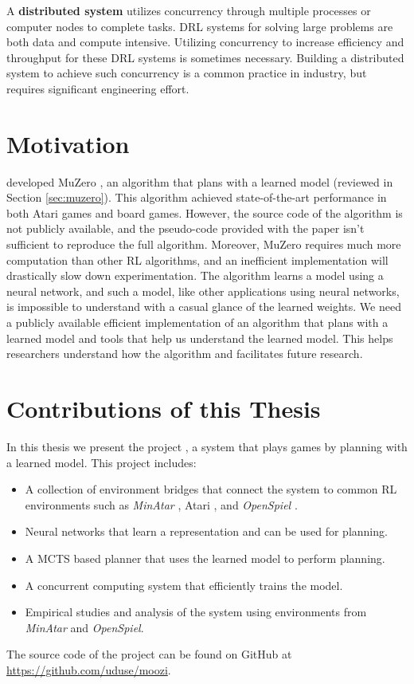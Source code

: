 A \textbf{distributed system} utilizes concurrency through multiple processes or computer nodes to complete tasks.
DRL systems for solving large problems are both data and compute intensive.
Utilizing concurrency to increase efficiency and throughput for these DRL systems is sometimes necessary.
Building a distributed system to achieve such concurrency is a common practice in industry, but requires significant engineering effort.

\section{Motivation}
\citeauthor{MasteringAtariGo_Schrittwieser.Antonoglou.ea_2020} developed MuZero \cite{MasteringAtariGo_Schrittwieser.Antonoglou.ea_2020}, an algorithm that plans with a learned model (reviewed in Section \ref{sec:muzero}).
This algorithm achieved state-of-the-art performance in both Atari games and board games.
However, the source code of the algorithm is not publicly available, and the pseudo-code provided with the paper isn't sufficient to reproduce the full algorithm.
Moreover, MuZero requires much more computation than other RL algorithms, and an inefficient implementation will drastically slow down experimentation.
The algorithm learns a model using a neural network, and such a model, like other applications using neural networks, is impossible to understand with a casual glance of the learned weights.
We need a publicly available efficient implementation of an algorithm that plans with a learned model and tools that help us understand the learned model.
This helps researchers understand how the algorithm and facilitates future research.

\section{Contributions of this Thesis}
In this thesis we present the project \textbf{\moozi}, a system that plays games by planning with a learned model.
This project includes:
\begin{itemize}
    \item A collection of environment bridges that connect the system to common RL environments such as \textit{MinAtar} \cite{MasteringAtariGames_Ye.Liu.ea_2021}, Atari \cite{ArcadeLearningEnvironment_Bellemare.Naddaf.ea_2013}, and \textit{OpenSpiel} \cite{OpenSpielFrameworkReinforcement_Lanctot.Lockhart.ea_2020}.
    \item Neural networks that learn a representation and can be used for planning.
    \item A MCTS based planner that uses the learned model to perform planning.
    \item A concurrent computing system that efficiently trains the model.
    \item Empirical studies and analysis of the system using environments from \textit{MinAtar} and \textit{OpenSpiel}.
\end{itemize}
The source code of the project can be found on GitHub at \url{https://github.com/uduse/moozi}.